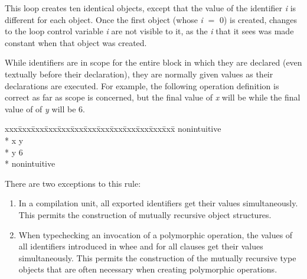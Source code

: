 This loop creates ten identical objects, except that the value
of the identifier {\it i} is different for each object.  Once the
first object (whose {\it i} $=$ 0) is created, changes to the loop
control variable {\it i} are not visible to it, as the {\it i} that it
sees was made constant when that object was created.

While identifiers are in scope for the entire block in which they are
declared (even textually before their declaration), they are normally given
values as their declarations are executed.  For example, the following
operation definition is correct as far as scope is concerned, but the
final value of {\it x} will be  while the final value of of {\it y}
will be 6.

{\small\it\begin{minipage}{\textwidth}\begin{tabbing}
xxx\=xxx\=xxx\=xxx\=xxx\=xxx\=xxx\=xxx\=xxx\=xxx\=xxx\=xxx\=xxx\=\+\kill%
 nonintuitive\+\\*{}%
   x \assign{} y\\*{}%
   y \assign{} 6\-\\*{}%
 nonintuitive
\end{tabbing}\end{minipage}}

There are two exceptions to this rule:
\begin{enumerate}
  \item{} In a compilation unit, all exported identifiers get their values
    simultaneously.  This permits the construction of mutually recursive
    object structures.
  \item{} When typechecking an invocation of a polymorphic operation, the
  values of all identifiers introduced in whee and for all clauses get their
  values simultaneously.  This permits the construction of the mutually
  recursive type objects that are often necessary when creating polymorphic
  operations.
\end{enumerate}
